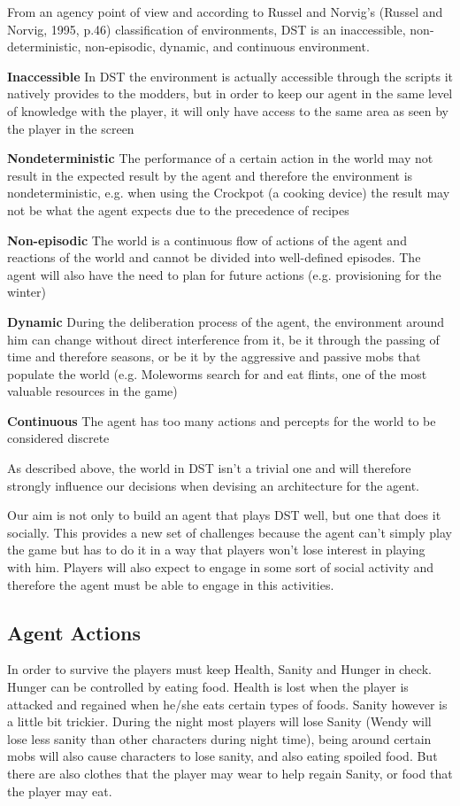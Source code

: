 From an agency point of view and according to Russel and Norvig’s (Russel and Norvig, 1995, p.46) classification of environments, DST is an inaccessible, non-deterministic, non-episodic, dynamic, and continuous environment.

\begin{description}
	\item \textbf{Inaccessible} In DST the environment is actually accessible through the scripts it natively provides to the modders, but in order to keep our agent in the same level of knowledge with the player, it will only have access to the same area as seen by the player in the screen
	\item \textbf{Nondeterministic} The performance of a certain action in the world may not result in the expected result by the agent and therefore the environment is nondeterministic, e.g. when using the Crockpot (a cooking device) the result may not be what the agent expects due to the precedence of recipes
	\item \textbf{Non-episodic} The world is a continuous flow of actions of the agent and reactions of the world and cannot be divided into well-defined episodes. 
The agent will also have the need to plan for future actions (e.g. provisioning for the winter)
	\item \textbf{Dynamic} During the deliberation process of the agent, the environment around him can change without direct interference from it, be it through the passing of time and therefore seasons, or be it by the aggressive and passive mobs that populate the world (e.g. Moleworms search for and eat flints, one of the most valuable resources in the game)
	\item \textbf{Continuous} The agent has too many actions and percepts for the world to be considered discrete
\end{description}

As described above, the world in DST isn’t a trivial one and will therefore strongly influence our decisions when devising an architecture for the agent.

Our aim is not only to build an agent that plays DST well, but one that does it socially.
This provides a new set of challenges because the agent can’t simply play the game but has to do it in a way that players won’t lose interest in playing with him.
Players will also expect to engage in some sort of social activity and therefore the agent must be able to engage in this activities.

\subsection*{Agent Actions}
In order to survive the players must keep Health, Sanity and Hunger in check.
Hunger can be controlled by eating food.
Health is lost when the player is attacked and regained when he/she eats certain types of foods.
Sanity however is a little bit trickier.
During the night most players will lose Sanity (Wendy will lose less sanity than other characters during night time), being around certain mobs will also cause characters to lose sanity, and also eating spoiled food.
But there are also clothes that the player may wear to help regain Sanity, or food that the player may eat.

